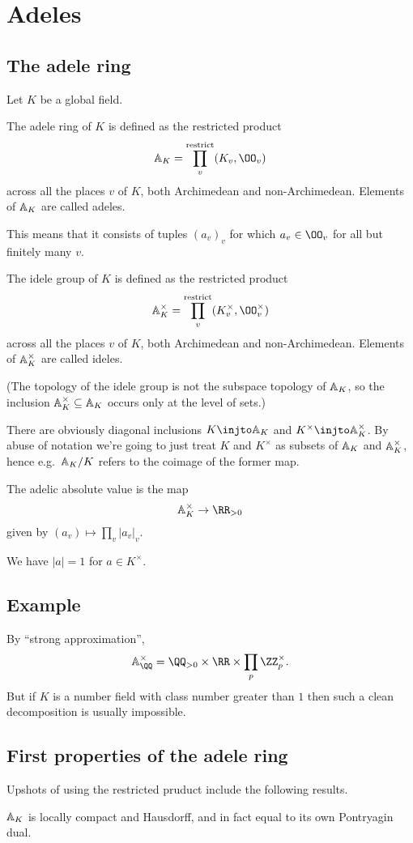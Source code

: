 \chapter{Adeles}
\section{The adele ring}
Let $K$ be a global field.
\begin{definition}
  The \alert{adele ring} of $K$ is defined as the restricted product
  \[ \AA_K = \rprod_v (K_v, \OO_v) \]
  across all the places $v$ of $K$, both Archimedean and non-Archimedean.
  Elements of $\AA_K$ are called \alert{adeles}.
\end{definition}
This means that it consists of tuples $(a_v)_{v}$
for which $a_v \in \OO_v$ for all but finitely many $v$.
\begin{definition}
The \alert{idele group} of $K$ is defined as the restricted product
\[ \AA_K^\times = \rprod_v (K_v^\times, \OO_v^\times) \]
across all the places $v$ of $K$,
both Archimedean and non-Archimedean.
Elements of $\AA_K^\times$ are called ideles.
\end{definition}
(The topology of the idele group is not the subspace topology of $\AA_K$,
so the inclusion $\AA_K^\times \subseteq \AA_K$
occurs only at the level of sets.)

There are obviously diagonal inclusions
$K \injto \AA_K$ and $K^\times \injto \AA_K^{\times}$.
By abuse of notation we're going to just treat
$K$ and $K^\times$ as subsets of $\AA_K$ and $\AA_K^\times$,
hence e.g.\ $\AA_K/K$ refers to the coimage of the former map.

The adelic absolute value is the map
\[ \AA_K^\times \to \RR_{>0} \]
given by $(a_v) \mapsto \prod_v \left\lvert a_v \right\rvert_v$.
\begin{proposition}
  We have $|a|=1$ for $a \in K^\times$.
\end{proposition}

\section{Example}
By ``strong approximation'',
\[ \AA_{\QQ}^\times
  = \QQ_{>0} \times \RR \times \prod_p \ZZ_p^\times. \]
But if $K$ is a number field with class number greater than $1$
then such a clean decomposition is usually impossible.

\section{First properties of the adele ring}
Upshots of using the restricted pruduct include
the following results.
\begin{theorem}
  $\AA_K$ is locally compact and Hausdorff,
  and in fact equal to its own Pontryagin dual.
\end{theorem}

